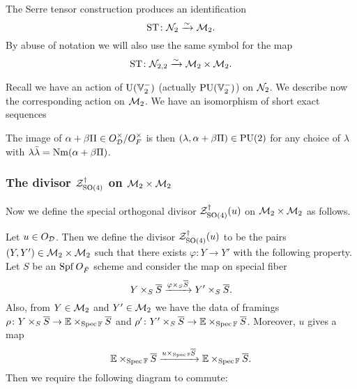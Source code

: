 \begin{proposition}
  The Serre tensor construction produces an identification
  \[ \operatorname{ST} \colon \mathcal N_2 \xrightarrow{\sim} \mathcal M_2. \]
  By abuse of notation we will also use the same symbol for the map
  \[ \operatorname{ST} \colon \mathcal N_{2,2} \xrightarrow{\sim} \mathcal M_2 \times \mathcal M_2. \]
\end{proposition}

Recall we have an action of $\operatorname{U}(\mathbb V_2^-)$ (actually $\operatorname{PU}(\mathbb V_2^-)$) on $\mathcal N_2$.
We describe now the corresponding action on $\mathcal M_2$.
We have an isomorphism of short exact sequences
\begin{center}
\end{center}
The image of $\alpha + \beta \Pi \in O_\mathcal D^\times / O_F^\times$
is then $(\lambda, \alpha + \beta \Pi) \in \operatorname{PU}(2)$
for any choice of $\lambda$ with $\lambda \bar \lambda = \operatorname{Nm} (\alpha + \beta \Pi)$.

\subsubsection{The divisor $\mathcal Z^{\dagger}_{\operatorname{SO}(4)}$ on $\mathcal M_2 \times \mathcal M_2$}
Now we define the special orthogonal divisor $\ZO4(u)$
on $\mathcal M_2 \times \mathcal M_2$ as follows.
\begin{definition}
  [$\ZO4(u)$]
  Let $u \in O_\mathcal D$.
  Then we define the divisor $\ZO4(u)$ to be the pairs $(Y, Y') \in \mathcal M_2 \times \mathcal M_2$
  such that there exists $\varphi \colon Y \to Y'$ with the following property.
  Let $S$ be an $\operatorname{Spf} O_{\breve F}$ scheme and consider the map on special fiber
  \[ Y \times_S \overline S \xrightarrow{\varphi \times_S \overline S} Y' \times_S \overline S. \]
  Also, from $Y \in \mathcal M_2$ and $Y' \in \mathcal M_2$ we have the data of framings
  $\rho \colon Y \times_S \overline S \to \mathbb E \times_{\operatorname{Spec} \mathbb F} \overline S$
  and $\rho' \colon Y' \times_S \overline S \to \mathbb E \times_{\operatorname{Spec} \mathbb F} \overline S$.
  Moreover, $u$ gives a map
  \[
    \mathbb E \times_{\operatorname{Spec} \mathbb F} \overline S
    \xrightarrow{u \times _{\operatorname{Spec} \mathbb F} \overline S}
    \mathbb E \times_{\operatorname{Spec} \mathbb F} \overline S.
  \]
  Then we require the following diagram to commute:
  \begin{center}
  \end{center}
\end{definition}

